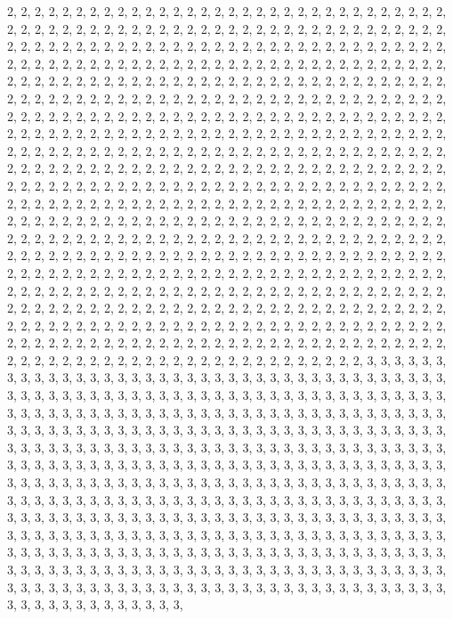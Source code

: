 \documentclass[
]{article}
\begin{document}
\begin{Schunk}
\begin{Soutput}
2, 2, 2, 2, 2, 2, 2, 2, 2, 2, 2, 2, 2, 2, 2, 2, 2, 2, 2, 2, 2, 2, 2, 2, 2, 2, 2, 2, 2, 2, 2, 2, 2, 2, 2, 2, 2, 2, 2, 2, 2, 2, 2, 2, 2, 2, 2, 2, 2, 2, 2, 2, 2, 2, 2, 2, 2, 2, 2, 2, 2, 2, 2, 2, 2, 2, 2, 2, 2, 2, 2, 2, 2, 2, 2, 2, 2, 2, 2, 2, 2, 2, 2, 2, 2, 2, 2, 2, 2, 2, 2, 2, 2, 2, 2, 2, 2, 2, 2, 2, 2, 2, 2, 2, 2, 2, 2, 2, 2, 2, 2, 2, 2, 2, 2, 2, 2, 2, 2, 2, 2, 2, 2, 2, 2, 2, 2, 2, 2, 2, 2, 2, 2, 2, 2, 2, 2, 2, 2, 2, 2, 2, 2, 2, 2, 2, 2, 2, 2, 2, 2, 2, 2, 2, 2, 2, 2, 2, 2, 2, 2, 2, 2, 2, 2, 2, 2, 2, 2, 2, 2, 2, 2, 2, 2, 2, 2, 2, 2, 2, 2, 2, 2, 2, 2, 2, 2, 2, 2, 2, 2, 2, 2, 2, 2, 2, 2, 2, 2, 2, 2, 2, 2, 2, 2, 2, 2, 2, 2, 2, 2, 2, 2, 2, 2, 2, 2, 2, 2, 2, 2, 2, 2, 2, 2, 2, 2, 2, 2, 2, 2, 2, 2, 2, 2, 2, 2, 2, 2, 2, 2, 2, 2, 2, 2, 2, 2, 2, 2, 2, 2, 2, 2, 2, 2, 2, 2, 2, 2, 2, 2, 2, 2, 2, 2, 2, 2, 2, 2, 2, 2, 2, 2, 2, 2, 2, 2, 2, 2, 2, 2, 2, 2, 2, 2, 2, 2, 2, 2, 2, 2, 2, 2, 2, 2, 2, 2, 2, 2, 2, 2, 2, 2, 2, 2, 2, 2, 2, 2, 2, 2, 2, 2, 2, 2, 2, 2, 2, 2, 2, 2, 2, 2, 2, 2, 2, 2, 2, 2, 2, 2, 2, 2, 2, 2, 2, 2, 2, 2, 2, 2, 2, 2, 2, 2, 2, 2, 2, 2, 2, 2, 2, 2, 2, 2, 2, 2, 2, 2, 2, 2, 2, 2, 2, 2, 2, 2, 2, 2, 2, 2, 2, 2, 2, 2, 2, 2, 2, 2, 2, 2, 2, 2, 2, 2, 2, 2, 2, 2, 2, 2, 2, 2, 2, 2, 2, 2, 2, 2, 2, 2, 2, 2, 2, 2, 2, 2, 2, 2, 2, 2, 2, 2, 2, 2, 2, 2, 2, 2, 2, 2, 2, 2, 2, 2, 2, 2, 2, 2, 2, 2, 2, 2, 2, 2, 2, 2, 2, 2, 2, 2, 2, 2, 2, 2, 2, 2, 2, 2, 2, 2, 2, 2, 2, 2, 2, 2, 2, 2, 2, 2, 2, 2, 2, 2, 2, 2, 2, 2, 2, 2, 2, 2, 2, 2, 2, 2, 2, 2, 2, 2, 2, 2, 2, 2, 2, 2, 2, 2, 2, 2, 2, 2, 2, 2, 2, 2, 2, 2, 2, 2, 2, 2, 2, 2, 2, 2, 2, 2, 2, 2, 2, 2, 2, 2, 2, 2, 2, 2, 2, 2, 2, 2, 2, 2, 2, 2, 2, 2, 2, 2, 2, 2, 2, 2, 2, 2, 2, 2, 2, 2, 2, 2, 2, 2, 2, 2, 2, 2, 2, 2, 2, 2, 2, 2, 2, 2, 2, 2, 2, 2, 2, 2, 2, 2, 2, 2, 2, 2, 2, 2, 2, 2, 2, 2, 2, 2, 2, 2, 2, 2, 2, 2, 2, 2, 2, 2, 2, 2, 2, 2, 2, 2, 2, 2, 2, 2, 2, 2, 2, 2, 2, 2, 2, 2, 2, 2, 2, 2, 2, 2, 2, 2, 2, 2, 2, 2, 2, 2, 2, 2, 2, 2, 2, 2, 2, 2, 2, 2, 2, 2, 2, 2, 2, 2, 2, 2, 2, 2, 2, 2, 2, 2, 2, 2, 2, 2, 2, 2, 2, 2, 2, 2, 2, 2, 2, 2, 2, 2, 2, 2, 2, 2, 2, 2, 2, 3, 3, 3, 3, 3, 3, 3, 3, 3, 3, 3, 3, 3, 3, 3, 3, 3, 3, 3, 3, 3, 3, 3, 3, 3, 3, 3, 3, 3, 3, 3, 3, 3, 3, 3, 3, 3, 3, 3, 3, 3, 3, 3, 3, 3, 3, 3, 3, 3, 3, 3, 3, 3, 3, 3, 3, 3, 3, 3, 3, 3, 3, 3, 3, 3, 3, 3, 3, 3, 3, 3, 3, 3, 3, 3, 3, 3, 3, 3, 3, 3, 3, 3, 3, 3, 3, 3, 3, 3, 3, 3, 3, 3, 3, 3, 3, 3, 3, 3, 3, 3, 3, 3, 3, 3, 3, 3, 3, 3, 3, 3, 3, 3, 3, 3, 3, 3, 3, 3, 3, 3, 3, 3, 3, 3, 3, 3, 3, 3, 3, 3, 3, 3, 3, 3, 3, 3, 3, 3, 3, 3, 3, 3, 3, 3, 3, 3, 3, 3, 3, 3, 3, 3, 3, 3, 3, 3, 3, 3, 3, 3, 3, 3, 3, 3, 3, 3, 3, 3, 3, 3, 3, 3, 3, 3, 3, 3, 3, 3, 3, 3, 3, 3, 3, 3, 3, 3, 3, 3, 3, 3, 3, 3, 3, 3, 3, 3, 3, 3, 3, 3, 3, 3, 3, 3, 3, 3, 3, 3, 3, 3, 3, 3, 3, 3, 3, 3, 3, 3, 3, 3, 3, 3, 3, 3, 3, 3, 3, 3, 3, 3, 3, 3, 3, 3, 3, 3, 3, 3, 3, 3, 3, 3, 3, 3, 3, 3, 3, 3, 3, 3, 3, 3, 3, 3, 3, 3, 3, 3, 3, 3, 3, 3, 3, 3, 3, 3, 3, 3, 3, 3, 3, 3, 3, 3, 3, 3, 3, 3, 3, 3, 3, 3, 3, 3, 3, 3, 3, 3, 3, 3, 3, 3, 3, 3, 3, 3, 3, 3, 3, 3, 3, 3, 3, 3, 3, 3, 3, 3, 3, 3, 3, 3, 3, 3, 3, 3, 3, 3, 3, 3, 3, 3, 3, 3, 3, 3, 3, 3, 3, 3, 3, 3, 3, 3, 3, 3, 3, 3, 3, 3, 3, 3, 3, 3, 3, 3, 3, 3, 3, 3, 3, 3, 3, 3, 3, 3, 3, 3, 3, 3, 3, 3, 3, 3, 3, 3, 3, 3, 3, 3, 3, 3, 3, 3, 3, 3, 3, 3, 3, 3, 3, 3, 3, 3, 3, 3, 3, 3, 3, 3, 3, 3, 3, 3, 3, 3, 3, 3, 3, 3, 3, 3, 3, 3, 3, 3, 3, 3, 3, 3, 3, 3, 3, 3, 3, 3, 3, 3, 3, 3, 3, 3, 3, 3, 3, 3, 3, 3, 3, 3, 3, 3, 3, 3, 
\end{Soutput}
\end{Schunk}
\end{document}
